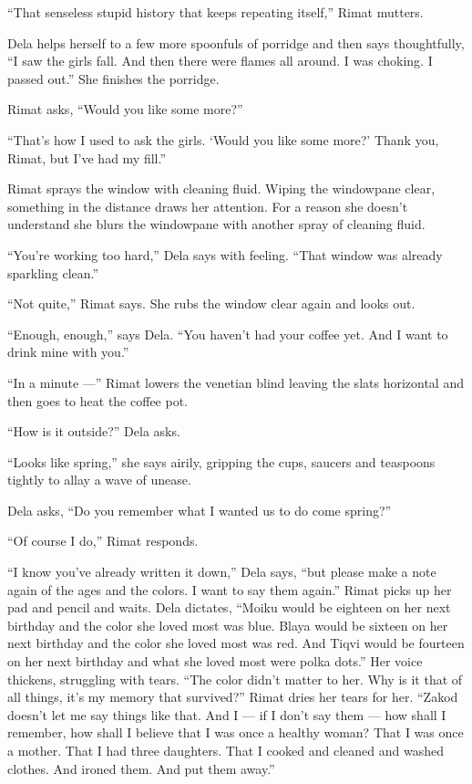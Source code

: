 \documentclass[twoside,11pt,openany]{book}
\begin{document}
``That senseless stupid history that keeps repeating itself,'' Rimat mutters.

Dela helps herself to a few more spoonfuls of porridge and then says thoughtfully, ``I saw the girls fall.
And then there were flames all around. I was choking. I passed out.'' She finishes the porridge.

Rimat asks, ``Would you like some more?''

``That's how I used to ask the girls. `Would you like some more?' Thank you, Rimat, but I've had my
fill.''

Rimat sprays the window with cleaning fluid. Wiping the windowpane clear, something{ }in the distance
draws her attention. For a reason she doesn't understand she blurs the windowpane with another spray of cleaning fluid.


``You're working too hard,'' Dela says with feeling. ``That window was already
sparkling clean.''

``Not quite,'' Rimat says. She rubs the window clear again and looks out.

``Enough, enough,'' says Dela. ``You haven't had your coffee yet.
And{ }I want to drink mine with you.''

``In a minute ---'' Rimat lowers the venetian blind leaving the slats horizontal and then goes
to heat the coffee pot.

``How is it outside?'' Dela asks.

``Looks like spring,'' she says airily, gripping the cups, saucers and teaspoons tightly to
allay a wave of unease.

Dela asks, ``Do you remember what I wanted us to do come spring?''

``Of course I do,'' Rimat responds.

``I know you've already written it down,'' Dela says, ``but please make a note again of the ages and the
colors.  I want to say them again.'' Rimat picks up her pad and pencil and waits. Dela dictates,
``Moiku would be eighteen on her next birthday and the color she loved most was blue. Blaya would be
sixteen on her next birthday and the color she loved most was red. And Tiqvi would be fourteen on her next birthday
and what she loved most were polka dots.'' Her voice thickens, struggling with tears.
``The color didn't matter to her. Why is it that of all things, it's my memory that
survived?'' Rimat dries her tears for her. ``Zakod doesn't let me say things like that. And I
--- if I don't say them --- how shall I remember, how shall I believe that I was once a healthy woman? That I was once a
mother. That I had three daughters. That I cooked and cleaned and washed clothes. And ironed them. And put them
away.''
\end{document}
